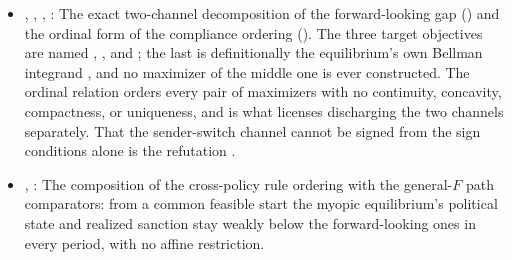\begin{itemize}[leftmargin=1.4em,itemsep=1pt]
\item {}, , , : The exact two-channel decomposition of the forward-looking gap () and the ordinal form of the compliance ordering (). The three target objectives are named , , and ; the last is definitionally the equilibrium's own Bellman integrand , and no maximizer of the middle one is ever constructed. The ordinal relation  orders every pair of maximizers with no continuity, concavity, compactness, or uniqueness, and  is what licenses discharging the two channels separately. That the sender-switch channel cannot be signed from the sign conditions alone is the refutation .
\item {}, : The composition of the cross-policy rule ordering with the general-\(F\) path comparators: from a common feasible start the myopic equilibrium's political state and realized sanction stay weakly below the forward-looking ones in every period, with no affine restriction.
\end{itemize}

